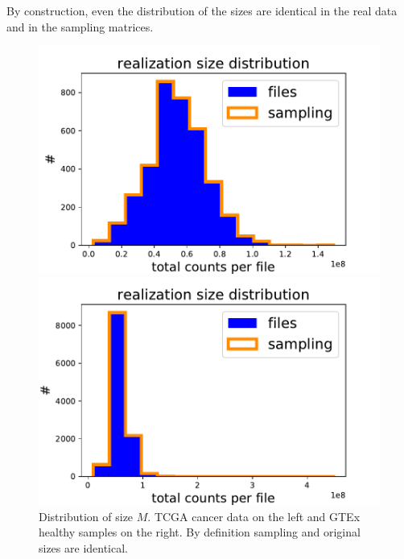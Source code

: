 By construction, even the distribution of the sizes are identical in the real data and in the sampling matrices.
\begin{figure}[htb!]
\begin{minipage}{0.5\textwidth}
    \centering
    \includegraphics[width=0.95\linewidth]{pictures/structure/tcga/sizeDistr_null.pdf}
\end{minipage}
\hspace{2mm}
\begin{minipage}{0.5\textwidth}
    \centering
    \includegraphics[width=0.95\linewidth]{pictures/structure/gtex/sizeDistr_null.pdf}
    \end{minipage}
\caption{Distribution of size $M$. TCGA cancer data on the left and GTEx healthy samples on the right. By definition sampling and original sizes are identical.}
    \label{fig:structure/sizeDistr_null}
\end{figure}

